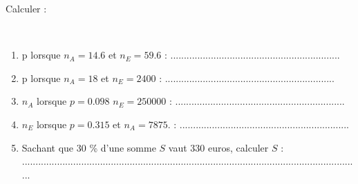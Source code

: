 Calculer :
\begin{questions}

	
	\question[5] \
	
	\begin{enumerate}[label=\alph*)]
		
		\item p lorsque $n_A=\num{14.6}$ et $n_E= \num{59.6} $ :  ...............................................................
		\item p lorsque $n_A=\num{18}$ et $n_E= \num{2400}$ : ...............................................................
		\item $n_A$ lorsque $p=\num{0.098}$ $n_E= \num{250000}$ : ...............................................................
		\item $n_E$ lorsque $p=\num{0.315} $ et $n_A=\num{7875}.$ : ...............................................................
		\item Sachant que 30 \% d'une somme $S$ vaut 330 euros, calculer $S$ :\\ ..............................................................................................................................
	\end{enumerate}
\end{questions}


